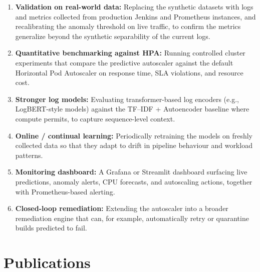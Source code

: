 \documentclass[a4paper,14pt,onecolumn]{report}
\begin{document}
\begin{enumerate}
    \item \textbf{Validation on real-world data:} Replacing the synthetic datasets with logs and metrics collected from production Jenkins and Prometheus instances, and recalibrating the anomaly threshold on live traffic, to confirm the metrics generalize beyond the synthetic separability of the current logs.
    \item \textbf{Quantitative benchmarking against HPA:} Running controlled cluster experiments that compare the predictive autoscaler against the default Horizontal Pod Autoscaler on response time, SLA violations, and resource cost.
    \item \textbf{Stronger log models:} Evaluating transformer-based log encoders (e.g., LogBERT-style models) against the TF--IDF + Autoencoder baseline where compute permits, to capture sequence-level context.
    \item \textbf{Online / continual learning:} Periodically retraining the models on freshly collected data so that they adapt to drift in pipeline behaviour and workload patterns.
    \item \textbf{Monitoring dashboard:} A Grafana or Streamlit dashboard surfacing live predictions, anomaly alerts, CPU forecasts, and autoscaling actions, together with Prometheus-based alerting.
    \item \textbf{Closed-loop remediation:} Extending the autoscaler into a broader remediation engine that can, for example, automatically retry or quarantine builds predicted to fail.
\end{enumerate}

	\appendix

	\chapter{Publications}
	
	\clearpage
\end{document}
